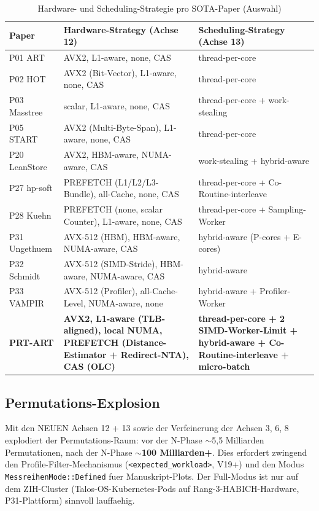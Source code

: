 \begin{table}[h!]
\centering
\caption{Hardware- und Scheduling-Strategie pro SOTA-Paper (Auswahl)}\label{tab:hw-sched-papers}
\small
\begin{tabular}{|l|l|l|}
\hline
\textbf{Paper} & \textbf{Hardware-Strategy (Achse 12)} & \textbf{Scheduling-Strategy (Achse 13)} \\
\hline
P01 ART          & AVX2, L1-aware, none, CAS                     & thread-per-core \\
P02 HOT          & AVX2 (Bit-Vector), L1-aware, none, CAS        & thread-per-core \\
P03 Masstree     & scalar, L1-aware, none, CAS                   & thread-per-core + work-stealing \\
P05 START        & AVX2 (Multi-Byte-Span), L1-aware, none, CAS   & thread-per-core \\
P20 LeanStore    & AVX2, HBM-aware, NUMA-aware, CAS              & work-stealing + hybrid-aware \\
P27 hp-soft      & PREFETCH (L1/L2/L3-Bundle), all-Cache, none, CAS & thread-per-core + Co-Routine-interleave \\
P28 Kuehn        & PREFETCH (none, scalar Counter), L1-aware, none, CAS & thread-per-core + Sampling-Worker \\
P31 Ungethuem    & AVX-512 (HBM), HBM-aware, NUMA-aware, CAS     & hybrid-aware (P-cores + E-cores) \\
P32 Schmidt      & AVX-512 (SIMD-Stride), HBM-aware, NUMA-aware, CAS & hybrid-aware \\
P33 VAMPIR       & AVX-512 (Profiler), all-Cache-Level, NUMA-aware, none & hybrid-aware + Profiler-Worker \\
\hline
\textbf{PRT-ART} & \textbf{AVX2, L1-aware (TLB-aligned), local NUMA, PREFETCH (Distance-Estimator + Redirect-NTA), CAS (OLC)} & \textbf{thread-per-core + 2 SIMD-Worker-Limit + hybrid-aware + Co-Routine-interleave + micro-batch} \\
\hline
\end{tabular}
\end{table}

\subsection{Permutations-Explosion}

Mit den NEUEN Achsen 12 + 13 sowie der Verfeinerung der Achsen 3, 6, 8
explodiert der Permutations-Raum: vor der N-Phase $\sim$5,5 Milliarden
Permutationen, nach der N-Phase \textbf{$\sim$100 Milliarden+}. Dies
erfordert zwingend den Profile-Filter-Mechanismus
(\texttt{<expected\_workload>}, V19+) und den Modus
\texttt{MessreihenMode::Defined} fuer Manuskript-Plots. Der
Full-Modus ist nur auf dem ZIH-Cluster (Talos-OS-Kubernetes-Pods auf
Rang-3-HABICH-Hardware, P31-Plattform) sinnvoll lauffaehig.
